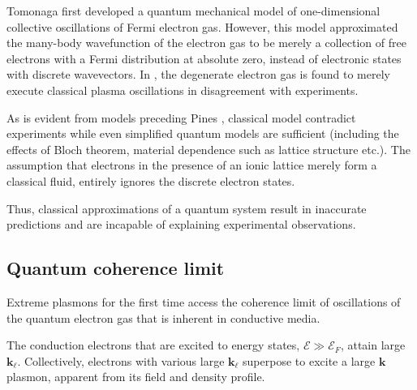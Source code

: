 \documentclass[aps,twocolumn,notitlepage,superscriptaddress]{revtex4-1}
\renewcommand\vec{\mathbf}
\begin{document}
Tomonaga \cite{Tomonaga-1950} first developed a quantum mechanical model of one-dimensional collective oscillations of Fermi electron gas. However, this model approximated the many-body wavefunction of the electron gas to be merely a collection of free electrons with a Fermi distribution at absolute zero, instead of electronic states with discrete wavevectors. In  \cite{Tomonaga-1950}, the degenerate electron gas is found to merely execute classical plasma oscillations in disagreement with experiments.

As is evident from models preceding Pines \cite{Pines-PhysRev-1953}, classical model contradict experiments while even simplified quantum models \cite{Pines-PhysRev-1953} are sufficient (including the effects of Bloch theorem, material dependence such as lattice structure etc.). The assumption that electrons in the presence of an ionic lattice merely form a classical fluid, entirely ignores the discrete electron states. 

Thus, classical approximations of a quantum system result in inaccurate predictions and are incapable of explaining experimental observations.

\subsection{Quantum coherence limit}
\label{subsec:quantum-coherence-limit}
Extreme plasmons \cite{plasmonics-ieee-2021,plasmonics-ieee-2022} for the first time access the coherence limit of  oscillations of the quantum electron gas that is inherent in conductive media. 

The conduction electrons that are excited to energy states, $\mathcal{E}\gg\mathcal{E}_F$, attain large $\vec{k_\ell}$. Collectively, electrons with various large $\vec{k_\ell}$ superpose to excite a large $\vec{k}$ plasmon, apparent from its field and density profile. 
\end{document}
